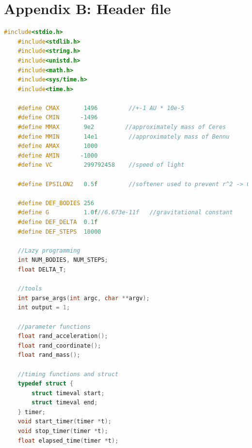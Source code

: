 \documentclass[11pt,a4paper]{article}
\begin{document}
	\section{Appendix B: Header file}
	\begin{lstlisting}[language=c]
	#include<stdio.h>
	#include<stdlib.h>
	#include<string.h>
	#include<unistd.h>
	#include<math.h>
	#include<sys/time.h>
	#include<time.h>
	
	#define CMAX       1496         //+-1 AU * 10e-5
	#define CMIN      -1496
	#define MMAX       9e2         //approximately mass of Ceres
	#define MMIN       14e1         //approximately mass of Bennu
	#define AMAX       1000
	#define AMIN      -1000
	#define VC         299792458    //speed of light
	
	#define EPSILON2   0.5f         //softener used to prevent r^2 -> 0
	
	#define DEF_BODIES 256
	#define G          1.0f//6.673e-11f   //gravitational constant
	#define DEF_DELTA  0.1f
	#define DEF_STEPS  10000
	
	//Lazy programming
	int NUM_BODIES, NUM_STEPS;
	float DELTA_T;
	
	//tools
	int parse_args(int argc, char **argv);
	int output = 1;
	
	//parameter functions
	float rand_acceleration();
	float rand_coordinate();
	float rand_mass();
	
	//timing functions and struct
	typedef struct {
		struct timeval start;
		struct timeval end;
	} timer;
	void start_timer(timer *t);
	void stop_timer(timer *t);
	float elapsed_time(timer *t);
	\end{lstlisting}
	
\end{document}
